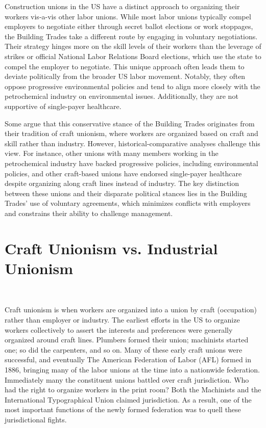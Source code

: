 Construction unions in the US have a distinct approach to organizing their workers vis-a-vis other labor unions. While most labor unions typically compel employers to negotiate either through secret ballot elections or work stoppages, the Building Trades take a different route by engaging in voluntary negotiations. Their strategy hinges more on the skill levels of their workers than the leverage of strikes or official National Labor Relations Board elections, which use the state to compel the employer to negotiate. This unique approach often leads them to deviate politically from the broader US labor movement. Notably, they often oppose progressive environmental policies and tend to align more closely with the petrochemical industry on environmental issues. Additionally, they are not supportive of single-payer healthcare.

Some argue that this conservative stance of the Building Trades originates from their tradition of craft unionism, where workers are organized based on craft and skill rather than industry. However, historical-comparative analyses challenge this view. For instance, other unions with many members working in the petrochemical industry have backed progressive policies, including environmental policies, and other craft-based unions have endorsed single-payer healthcare despite organizing along craft lines instead of industry. The key distinction between these unions and their disparate political stances lies in the Building Trades' use of voluntary agreements, which minimizes conflicts with employers and constrains their ability to challenge management.


\section{Craft Unionism vs. Industrial Unionism} \

Craft unionism is when workers are organized into a union by craft (occupation) rather than employer or industry. The earliest efforts in the US to organize workers collectively to assert the interests and preferences were generally organized around craft lines. Plumbers formed their union; machinists started one; so did the carpenters, and so on. Many of these early craft unions were successful, and eventually The American Federation of Labor (AFL) formed in 1886, bringing many of the labor unions at the time into a nationwide federation. Immediately many the constituent unions battled over craft jurisdiction. Who had the right to organize workers in the print room? Both the Machinists and the International Typographical Union claimed jurisdiction. As a result, one of the most important functions of the newly formed federation was to quell these jurisdictional fights.

